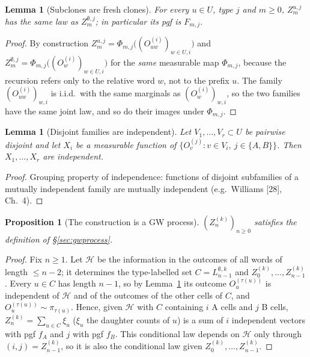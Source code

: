 \documentclass[11pt]{article}
\newtheorem{lemma}[theorem]{Lemma}
\newtheorem{proposition}[theorem]{Proposition}
\theoremstyle{definition}
\theoremstyle{remark}
\begin{document}
\begin{lemma}[Subclones are fresh clones]\label{lem:fresh}
For every $u\in U$, type $j$ and $m\ge0$, $Z_m^{u,j}$ has the same law as $Z_m^{\emptyset,j}$; in particular its pgf is $F_{m,j}$.
\end{lemma}
\begin{proof}
By construction $Z_m^{u,j}=\Phi_{m,j}\big((O^{(i)}_{uw})_{w\in U,i}\big)$ and $Z_m^{\emptyset,j}=\Phi_{m,j}\big((O^{(i)}_w)_{w\in U,i}\big)$ for the \emph{same} measurable map $\Phi_{m,j}$, because the recursion refers only to the relative word $w$, not to the prefix $u$. The family $(O^{(i)}_{uw})_{w,i}$ is i.i.d.\ with the same marginals as $(O^{(i)}_w)_{w,i}$, so the two families have the same joint law, and so do their images under $\Phi_{m,j}$.
\end{proof}

\begin{lemma}[Disjoint families are independent]\label{lem:indepfam}
Let $V_1,\dots,V_r\subset U$ be pairwise disjoint and let $X_i$ be a measurable function of $\{O^{(j)}_v:v\in V_i,\ j\in\{A,B\}\}$. Then $X_1,\dots,X_r$ are independent.
\end{lemma}
\begin{proof}
Grouping property of independence: functions of disjoint subfamilies of a mutually independent family are mutually independent (e.g.\ Williams [28], Ch.~4).
\end{proof}

\begin{proposition}[The construction is a GW process]\label{prop:construction}
$(Z^{(k)}_n)_{n\ge0}$ satisfies the definition of \S\ref{sec:gwprocess}.
\end{proposition}
\begin{proof}
Fix $n\ge1$. Let $\mathcal H$ be the information in the outcomes of all words of length $\le n-2$; it determines the type-labelled set $C=L^{\emptyset,k}_{n-1}$ and $Z^{(k)}_0,\dots,Z^{(k)}_{n-1}$. Every $u\in C$ has length $n-1$, so by Lemma~\ref{lem:indepfam} its outcome $O_u^{(\tau(u))}$ is independent of $\mathcal H$ and of the outcomes of the other cells of $C$, and $O^{(\tau(u))}_u\sim\pi_{\tau(u)}$. Hence, given $\mathcal H$ with $C$ containing $i$ A cells and $j$ B cells, $Z^{(k)}_n=\sum_{u\in C}\xi_u$ ($\xi_u$ the daughter counts of $u$) is a sum of $i$ independent vectors with pgf $f_A$ and $j$ with pgf $f_B$. This conditional law depends on $\mathcal H$ only through $(i,j)=Z^{(k)}_{n-1}$, so it is also the conditional law given $Z^{(k)}_0,\dots,Z^{(k)}_{n-1}$.
\end{proof}
\end{document}
